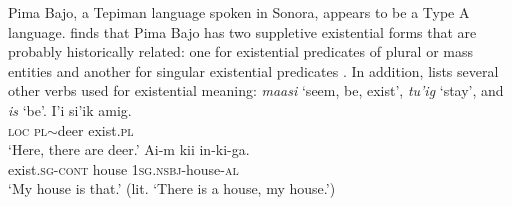 \documentclass[output=paper,draft,draftmode,colorlinks,citecolor=brown]{langscibook}
\begin{document}
Pima Bajo, a Tepiman language spoken in Sonora, appears to be a Type A language. \citet[149]{estrada2014} finds that Pima Bajo has two suppletive existential forms that are probably historically related: one for existential predicates of plural or mass entities  and another for singular existential predicates . In addition, \citet[154]{estrada2014} lists several other verbs used for existential meaning: \emph{maasi} `seem, be, exist', \emph{tu'ig} `stay', and \emph{is} `be'.
\ea
\label{ex:odam-pbdeer}
\gll	I’i 	si’ik 		amig.\\
\textsc{loc} 	\textsc{pl}$\sim$deer	exist.\textsc{pl}\\
\glt `Here, there are deer.’ \citep[149]{estrada2014}
\z
\ea
\label{ex:odam-pbhouse}
\gll	Ai-m 		kii 	in-ki-ga.\\
exist.\textsc{sg-cont}	house 	\textsc{1sg.nsbj}-house-\textsc{al}\\
\glt `My house is that.’ (lit. `There is a house, my house.’)
\citep[150]{estrada2014}
\z
\end{document}

